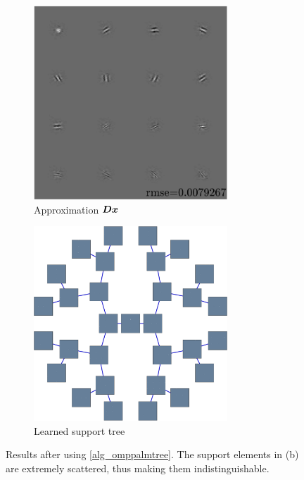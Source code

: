 \begin{figure}[!ht] \centering
\begin{subfigure}[b]{0.49\textwidth}\centering
\includegraphics[width=0.8\textwidth]{figures/tree-scattered-supports/xp_learnsupp256_curvelet_decomp3+tree-binary_dpth4+supp-diracs+usegrad0_every5_add5_totinit0_totadd279_a0_b1_approx.pdf}
\caption{Approximation $\bm{D}\bm{x}$}
\end{subfigure}
\begin{subfigure}[b]{0.49\textwidth}\centering
\includegraphics[width=0.8\textwidth]{figures/tree-scattered-supports/xp_learnsupp256_curvelet_decomp3+tree-binary_dpth4+supp-diracs+usegrad0_every5_add5_totinit0_totadd279_a0_b1_tree.pdf}
	\caption{Learned support tree}\label{fig_test_omppalmtree_tree}
\end{subfigure}
\caption{Results after using \cref{alg_omppalmtree}. The support elements in (b) are extremely scattered, thus making them indistinguishable.}\label{fig_test_omppalmtree}
\end{figure}

